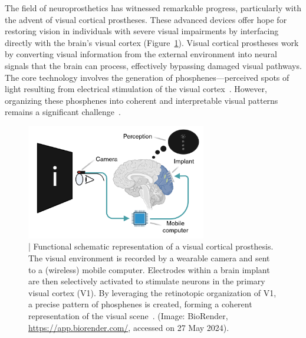 \documentclass[twocolumn,10pt]{article}
\begin{document}
The field of neuroprosthetics has witnessed remarkable progress, particularly
with the advent of visual cortical prostheses. These advanced devices offer hope
for restoring vision in individuals with severe visual impairments by
interfacing directly with the brain's visual cortex
(Figure~\ref{fig:schematic}). Visual cortical prostheses work by converting
visual information from the external environment into neural signals that the
brain can process, effectively bypassing damaged visual pathways. The core
technology involves the generation of phosphenes---perceived spots of light
resulting from electrical stimulation of the visual
cortex~\parencite{vandergrintenBiologicallyPlausiblePhosphene2024}. However,
organizing these phosphenes into coherent and interpretable visual patterns
remains a significant challenge~\parencite{merabetWhatBlindnessCan2005}.

\pagestyle{rest} %

\begin{figure}[ht!]
      \centering
      \includegraphics[width=0.7\textwidth]{imgs/visual_cortical_prothesis.png}
      \caption{| Functional schematic representation of a visual cortical
            prosthesis. The visual environment is recorded by a wearable camera
            and sent to a (wireless) mobile computer. Electrodes within a brain
            implant are then selectively activated to stimulate neurons in the
            primary visual cortex (V1). By leveraging the retinotopic
            organization of V1, a precise pattern of phosphenes is created,
            forming a coherent representation of the visual
            scene~\parencite{chenShapePerceptionHighchannelcount2020}. (Image:
            BioRender,
            \href{https://app.biorender.com/}{https://app.biorender.com/},
            accessed on 27 May 2024).}\label{fig:schematic}
\end{figure}
\end{document}

